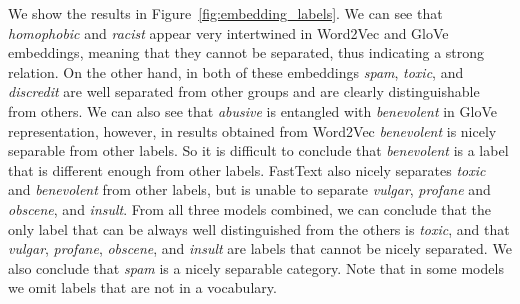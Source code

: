 \documentclass[fleqn,moreauthors,10pt]{ds_report}
\begin{document}
We show the results in Figure~\ref{fig:embedding_labels}. We can see that \textit{homophobic} and \textit{racist} appear very intertwined in Word2Vec and GloVe embeddings, meaning that they cannot be separated, thus indicating a strong relation. On the other hand, in both of these embeddings \textit{spam}, \textit{toxic}, and \textit{discredit} are well separated from other groups and are clearly distinguishable from others. We can also see that \textit{abusive} is entangled with \textit{benevolent} in GloVe representation, however, in results obtained from Word2Vec  \textit{benevolent} is nicely separable from other labels. So it is difficult to conclude that \textit{benevolent} is a label that is different enough from other labels. FastText also nicely separates \textit{toxic} and \textit{benevolent} from other labels, but is unable to separate \textit{vulgar}, \textit{profane} and \textit{obscene}, and \textit{insult}. From all three models combined, we can conclude that the only label that can be always well distinguished from the others is \textit{toxic}, and that \textit{vulgar}, \textit{profane}, \textit{obscene}, and \textit{insult} are labels that cannot be nicely separated. We also conclude that \textit{spam} is a nicely separable category. Note that in some models we omit labels that are not in a vocabulary.
\end{document}

